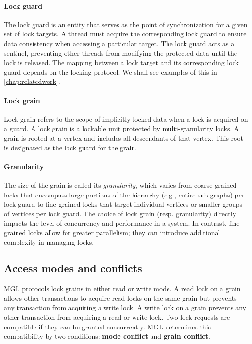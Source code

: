 \paragraph{Lock guard} The lock guard is an entity that serves as the point of synchronization for a given set of lock targets. A thread must acquire the corresponding lock guard to ensure data consistency when accessing a particular target. The lock guard acts as a sentinel, preventing other threads from modifying the protected data until the lock is released. The mapping between a lock target and its corresponding lock guard depends on the locking protocol. We shall see examples of this in \cref{chap:relatedwork}.

\paragraph{Lock grain} Lock grain refers to the scope of implicitly locked data when a lock is acquired on a guard. A lock grain is a lockable unit protected by multi-granularity locks. A grain is rooted at a vertex and includes all descendants of that vertex. This root is designated as the lock guard for the grain.

\paragraph{Granularity} The size of the grain is called its \emph{granularity}, which varies from coarse-grained locks that encompass large portions of the hierarchy (e.g., entire sub-graphs) per lock guard to fine-grained locks that target individual vertices or smaller groups of vertices per lock guard. The choice of lock grain (resp. granularity) directly impacts the level of concurrency and performance in a system. In contrast, fine-grained locks allow for greater parallelism; they can introduce additional complexity in managing locks.

\subsection{Access modes and conflicts}

MGL protocols lock grains in either read or write mode. A read lock on a grain allows other transactions to acquire read locks on the same grain but prevents any transaction from acquiring a write lock. A write lock on a grain prevents any other transaction from acquiring a read or write lock.
Two lock requests are compatible if they can be granted concurrently. MGL determines this compatibility by two conditions: \textbf{mode conflict} and \textbf{grain conflict}. 


